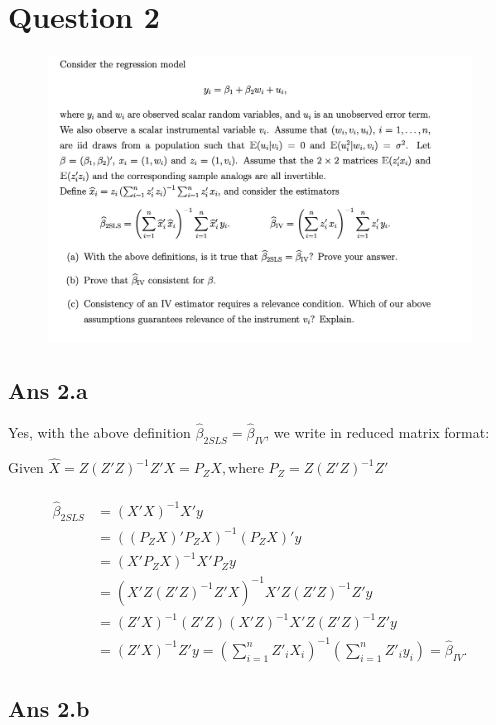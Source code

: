 \documentclass{article}
\begin{document}
\section*{Question 2}
\begin{figure}[!htbp]
    \centering
    \includegraphics[width=1\linewidth]{Question 2.png}
\end{figure}
\subsection*{Ans 2.a }
Yes, with the above definition \( \hat{\beta}_{2SLS} = \hat{\beta}_{IV} \), we write in reduced matrix format:

Given $ \hat{X} = Z(Z'Z)^{-1}Z'X = P_Z X, \text{where } P_Z = Z(Z'Z)^{-1}Z'$ \\
\\
\begin{align*}
\hat{\beta}_{2SLS} &= (X'X)^{-1}X'y \\
&= ((P_Z X)'P_Z X)^{-1}(P_Z X)'y \\
&= (X'P_Z X)^{-1}X'P_Z y \\
&= (X'Z(Z'Z)^{-1}Z'X)^{-1}X'Z(Z'Z)^{-1}Z'y \\
&= (Z'X)^{-1}(Z'Z)(X'Z)^{-1}X'Z(Z'Z)^{-1}Z'y \\
&= (Z'X)^{-1}Z'y = \left( \sum_{i=1}^{n} Z'_i X_i \right)^{-1} \left( \sum_{i=1}^{n} Z'_i y_i \right)= \hat{\beta}_{IV}.
\end{align*}


\subsection*{Ans 2.b }
\end{document}
